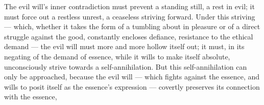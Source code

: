 \documentclass[12pt,a4paper]{book}
\begin{document}
The evil will's inner contradiction must prevent a standing still, a rest in
evil; it must force out a restless unrest, a ceaseless striving forward. Under
this striving --- which, whether it takes the form of a tumbling about in
pleasure or of a direct struggle against the good, constantly encloses defiance,
resistance to the ethical demand --- the evil will must more and more hollow
itself out; it must, in its negating of the demand of essence, while it wills to
make itself absolute, unconsciously strive towards a self-annihilation. But this
self-annihilation can only be approached, because the evil will --- which fights
against the essence, and wills to posit itself as the essence's expression ---
covertly preserves its connection with the essence,
\end{document}
